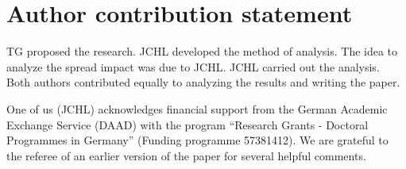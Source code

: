 \section{Author contribution statement}

TG proposed the research. JCHL developed the method of analysis. The idea to
analyze the spread impact was due to JCHL. JCHL carried out the analysis. Both
authors contributed equally to analyzing the results and writing the paper.

\begin{acknowledgement}
    One of us (JCHL) acknowledges financial support from the German Academic
    Exchange Service (DAAD) with the program ``Research Grants - Doctoral
    Programmes in Germany'' (Funding programme 57381412). We are grateful to
    the referee of an earlier version of the paper for several helpful
    comments.
\end{acknowledgement}
